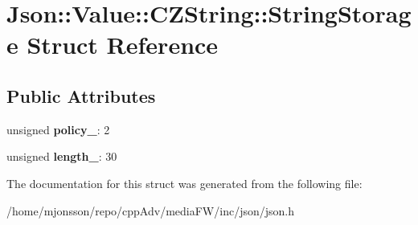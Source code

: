 \hypertarget{structJson_1_1Value_1_1CZString_1_1StringStorage}{}\section{Json\+:\+:Value\+:\+:C\+Z\+String\+:\+:String\+Storage Struct Reference}
\label{structJson_1_1Value_1_1CZString_1_1StringStorage}
\subsection*{Public Attributes}
\begin{DoxyCompactItemize}
\item 
\mbox{\label{structJson_1_1Value_1_1CZString_1_1StringStorage_a7f68c8d6197c5692a525854b5f29f87b}} 
unsigned {\bfseries policy\+\_\+}\+: 2
\item 
\mbox{\label{structJson_1_1Value_1_1CZString_1_1StringStorage_a165d865c44e6471d34668eeb4f15b140}} 
unsigned {\bfseries length\+\_\+}\+: 30
\end{DoxyCompactItemize}


The documentation for this struct was generated from the following file\+:\begin{DoxyCompactItemize}
\item 
/home/mjonsson/repo/cpp\+Adv/media\+F\+W/inc/json/json.\+h\end{DoxyCompactItemize}
